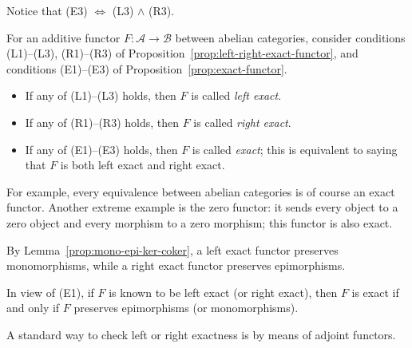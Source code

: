 Notice that (E3) $\iff$ (L3) $\wedge$ (R3).
\begin{definition}\label{def:exact-functor}
For an additive functor $F:\mathcal{A}\to\mathcal{B}$ between abelian
categories, consider conditions (L1)--(L3), (R1)--(R3) of
Proposition~\ref{prop:left-right-exact-functor}, and conditions (E1)--(E3) of
Proposition~\ref{prop:exact-functor}.
\begin{itemize}
	\item If any of (L1)--(L3) holds, then $F$ is called \emph{left exact}.
	\item If any of (R1)--(R3) holds, then $F$ is called \emph{right exact}.
	\item If any of (E1)--(E3) holds, then $F$ is called \emph{exact}; this is
	equivalent to saying that $F$ is both left exact and right exact.
\end{itemize}
\end{definition}

For example, every equivalence between abelian categories is of course an
exact functor. Another extreme example is the zero functor: it sends every
object to a zero object and every morphism to a zero morphism; this functor is
also exact.

By Lemma~\ref{prop:mono-epi-ker-coker}, a left exact functor preserves
monomorphisms, while a right exact functor preserves epimorphisms.

\begin{remark}\label{rem:exactness-mono-epi}
In view of (E1), if $F$ is known to be left exact (or right exact), then $F$ is
exact if and only if $F$ preserves epimorphisms (or monomorphisms).
\end{remark}

A standard way to check left or right exactness is by means of adjoint
functors.

